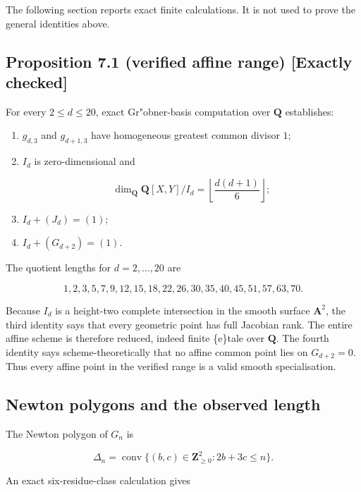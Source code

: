 \documentclass[
]{article}
\begin{document}
The following section reports exact finite calculations. It is not used
to prove the general identities above.

\subsection*{Proposition 7.1 (verified affine range) {[}Exactly
checked{]}}\label{proposition-7.1-verified-affine-range-exactly-checked}

For every \(2\le d\le20\), exact Gr"obner-basis computation over
\(\mathbf Q\) establishes:

\begin{enumerate}
\def\labelenumi{\arabic{enumi}.}
\item
  \(g_{d,3}\) and \(g_{d+1,3}\) have homogeneous greatest common divisor
  \(1\);
\item
  \(I_d\) is zero-dimensional and

  \[
  \dim_{\mathbf Q}\mathbf Q[X,Y]/I_d
  =\left\lfloor\frac{d(d+1)}6\right\rfloor;
  \tag{7.1}
  \]
\item
  \(I_d+(J_d)=(1)\);
\item
  \(I_d+(G_{d+2})=(1)\).
\end{enumerate}

The quotient lengths for \(d=2,\ldots,20\) are

\[
1,2,3,5,7,9,12,15,18,22,26,30,35,40,45,51,57,63,70.
\]

Because \(I_d\) is a height-two complete intersection in the smooth
surface \(\mathbf A^2\), the third identity says that every geometric
point has full Jacobian rank. The entire affine scheme is therefore
reduced, indeed finite \textquotesingle\{e\}tale over \(\mathbf Q\). The
fourth identity says scheme-theoretically that no affine common point
lies on \(G_{d+2}=0\). Thus every affine point in the verified range is
a valid smooth specialisation.

\subsection{Newton polygons and the observed
length}\label{newton-polygons-and-the-observed-length}

The Newton polygon of \(G_n\) is

\[
\Delta_n=\operatorname{conv}\{(b,c)\in\mathbf Z_{\ge0}^2:2b+3c\le n\}.
\]

An exact six-residue-class calculation gives
\end{document}
